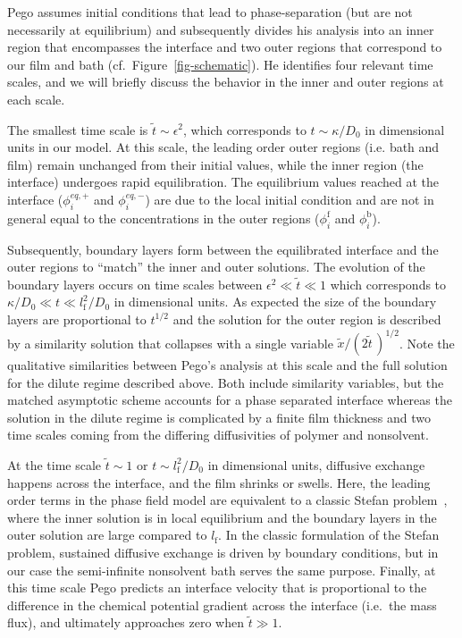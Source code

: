 \documentclass[journal=mamobx, layout=twocolumn]{achemso}
\newcommand{\txtf}{\mathrm{f}}
\newcommand{\txtb}{\mathrm{b}}
\begin{document}
Pego assumes initial conditions that lead to phase-separation (but are not necessarily at equilibrium) and subsequently divides his analysis into an inner region that encompasses the interface and two outer regions that correspond to our film and bath (cf.\ Figure~\ref{fig-schematic}).
He identifies four relevant time scales, and we will briefly discuss the behavior in the inner and outer regions at each scale.

The smallest time scale is $\tilde{t} \sim \epsilon^{2}$, which corresponds to $t \sim \kappa/D_{0}$ in dimensional units in our model.
At this scale, the leading order outer regions (i.e. bath and film) remain unchanged from their initial values, while the inner region (the interface) undergoes rapid equilibration.
The equilibrium values reached at the interface ($\phi_{i}^{eq,+}$ and $\phi_{i}^{eq,-}$) are due to the local initial condition and are not in general equal to the concentrations in the outer regions ($\phi_{i}^{\txtf}$ and $\phi_{i}^{\txtb}$).

Subsequently, boundary layers form between the equilibrated interface and the outer regions to ``match'' the inner and outer solutions.
The evolution of the boundary layers occurs on time scales between $\epsilon^{2} \ll \tilde{t} \ll 1$ which corresponds to $ \kappa/D_{0} \ll t \ll l_{\txtf}^{2}/D_{0}$ in dimensional units.
As expected the size of the boundary layers are proportional to $t^{1/2}$ and the solution for the outer region is described by a similarity solution that collapses with a single variable $\tilde{x}/( 2 \tilde{t}\,)^{1/2}$.
Note the qualitative similarities between Pego's analysis at this scale and the full solution for the dilute regime described above.
Both include similarity variables, but the matched asymptotic scheme accounts for a phase separated interface whereas the solution in the dilute regime is complicated by a finite film thickness and two time scales coming from the differing diffusivities of polymer and nonsolvent.

At the time scale $\tilde{t} \sim 1$ or $t \sim l_{\txtf}^{2}/D_{0}$ in dimensional units, diffusive exchange happens across the interface, and the film shrinks or swells.
Here, the leading order terms in the phase field model are equivalent to a classic Stefan problem~\cite{Pego1989, Tarzia2000}, where the inner solution is in local equilibrium and the boundary layers in the outer solution are large compared to $l_{\txtf}$.
In the classic formulation of the Stefan problem, sustained diffusive exchange is driven by boundary conditions, but in our case the semi-infinite nonsolvent bath serves the same purpose.
Finally, at this time scale Pego predicts an interface velocity that is proportional to the difference in the chemical potential gradient across the interface (i.e.\ the mass flux), and ultimately approaches zero when $\tilde{t} \gg 1$.
\end{document}
